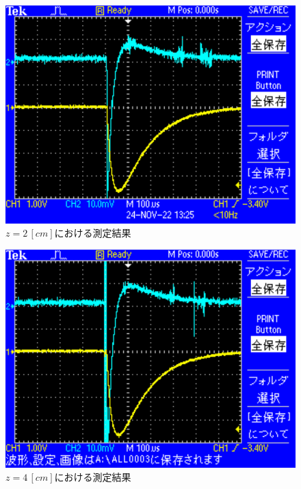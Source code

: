 \begin{figure}[H]
    \centering
    \includegraphics[scale=0.5]{images-2.pdf}
    \caption{$z=2\,[cm]$における測定結果}
\end{figure}

\begin{figure}[H]
    \centering
    \includegraphics[scale=0.5]{images-3.pdf}
    \caption{$z=4\,[cm]$における測定結果}
\end{figure}

